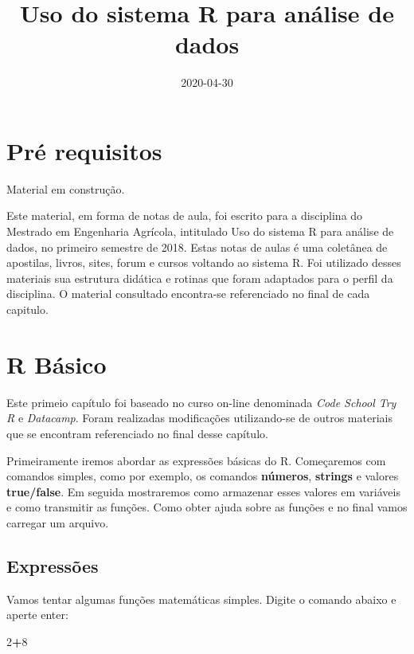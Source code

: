 \documentclass[
]{book}
\title{Uso do sistema R para análise de dados}
\author{}
\date{\vspace{-2.5em}2020-04-30}
\newenvironment{Shaded}{\begin{snugshade}}{\end{snugshade}}
\newcommand{\DecValTok}[1]{\textcolor[rgb]{0.00,0.00,0.81}{#1}}
\newcommand{\OperatorTok}[1]{\textcolor[rgb]{0.81,0.36,0.00}{\textbf{#1}}}
\begin{document}
\maketitle

{
\setcounter{tocdepth}{1}
\tableofcontents
}
\hypertarget{pruxe9-requisitos}{%
\chapter{Pré requisitos}\label{pruxe9-requisitos}}

Material em construção.

Este material, em forma de notas de aula, foi escrito para a disciplina do Mestrado em Engenharia Agrícola, intitulado Uso do sistema R para análise de dados, no primeiro semestre de 2018.
Estas notas de aulas é uma coletânea de apostilas, livros, sites, forum e cursos voltando ao sistema R. Foi utilizado desses materiais sua estrutura didática e rotinas que foram adaptados para o perfil da disciplina.
O material consultado encontra-se referenciado no final de cada capitulo.

\hypertarget{r-buxe1sico}{%
\chapter{R Básico}\label{r-buxe1sico}}

Este primeio capítulo foi baseado no curso on-line denominada \emph{Code School Try R} e \emph{Datacamp}. Foram realizadas modificações utilizando-se de outros materiais que se encontram referenciado no final desse capítulo.

Primeiramente iremos abordar as expressões básicas do R.
Começaremos com comandos simples, como por exemplo, os comandos \textbf{números}, \textbf{strings} e valores \textbf{true/false}. Em seguida mostraremos como armazenar esses valores em variáveis e como transmitir as funções. Como obter ajuda sobre as funções e no final vamos carregar um arquivo.

\hypertarget{expressuxf5es}{%
\section{Expressões}\label{expressuxf5es}}

Vamos tentar algumas funções matemáticas simples. Digite o comando abaixo e aperte enter:

\begin{Shaded}
\begin{Highlighting}[]
\DecValTok{2}\OperatorTok{+}\DecValTok{8}
\end{Highlighting}
\end{Shaded}
\end{document}
